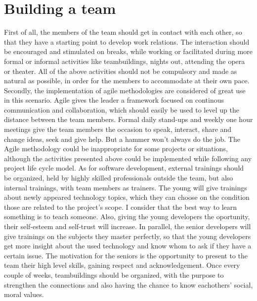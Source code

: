 \documentclass[conference]{IEEEtran}
\begin{document}
\section{Building a team}
First of all, the members of the team should get in contact with each other, so that they have a starting point to develop work relations. The interaction should be encouraged and stimulated on breaks, while working or facilitated during more formal or informal activities like teambuildings, nights out, attending the opera or theater. All of the above activities should not be compulsory and made as natural as possible, in order for the members to accommodate at their own pace.
\newline\indent
Secondly, the implementation of agile methodologies are considered of great use in this scenario. Agile gives the leader a framework focused on continous communication and collaboration, which should easily be used to level up the distance between the team members. Formal daily stand-ups and weekly one hour meetings give the team members the occasion to speak, interact, share and change ideas, seek and give help. But a hammer won't always do the job.\cite{IEEEhowto:oldvsyoung} The Agile methodology could be inappropriate for some projects or situations, although the activities presented above could be implemented while following any project life cycle model.
\newline\indent
As for software development, external trainings should be organized, held by highly skilled professionals outside the team, but also internal trainings, with team members as trainers. The young will give trainings about newly appeared technology topics, which they can choose on the condition those are related to the project's scope. I consider that the best way to learn something is to teach someone. Also, giving the young developers the oportunity, their self-esteem and self-trust will increase. In parallel, the senior developers will give trainings on the subjects they master perfectly, so that the young developers get more insight about the used technology and know whom to ask if they have a certain issue. The motivation for the seniors is the opportunity to present to the team their high level skills, gaining respect and acknowledgement. 
\newline\indent
Once every couple of weeks, teambuildings should be organized, with the purpose to strengthen the connections and also having the chance to know eachothers' social, moral values.
\newline\indent
\end{document}
